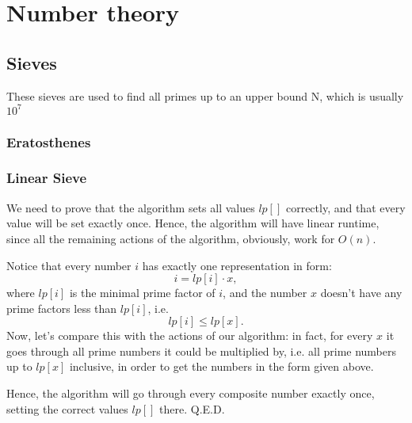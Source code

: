 \chapter{Number theory}

\section{Sieves}

    These sieves are used to find all primes up to an upper bound N, which is usually $10^7$

    \subsection{Eratosthenes}
    

    \subsection{Linear Sieve}

    We need to prove that the algorithm sets all values
    $lp[]$ correctly, and that every value will be set exactly once. 
    Hence, the algorithm will have linear runtime, since all the remaining actions of the algorithm, obviously, work for
    $O(n)$.

    Notice that every number $i$ has exactly one representation in form:
    $$i = lp [i] \cdot x,$$
    where 
    $lp [i]$ is the minimal prime factor of 
    $i$, and the number 
    $x$ doesn't have any prime factors less than 
    $lp [i]$, i.e.
    $$lp [i] \le lp [x].$$
    Now, let's compare this with the actions of our algorithm: in fact, for every 
    $x$ it goes through all prime numbers it could be multiplied by, i.e. all prime numbers up to 
    $lp [x]$ inclusive, in order to get the numbers in the form given above.

    Hence, the algorithm will go through every composite number exactly once, setting the correct values 
    $lp []$ there. Q.E.D.

